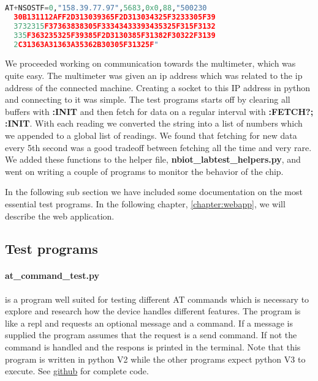 \documentclass[USenglish]{ifimaster}  %
\begin{document}
\begin{lstlisting}[caption={\acrshort{nb-iot} sample transmit},label={samplecommand},language=Python]
  AT+NSOSTF=0,"158.39.77.97",5683,0x0,88,"500230
  30B131112AFF2D313039365F2D313034325F3233305F39
  3732315F37363838305F33343433393435325F315F3132
  335F363235325F39385F2D3130385F31382F30322F3139
  2C31363A31363A35362B30305F31325F"
\end{lstlisting}

We proceeded working on communication towards the multimeter, which was quite easy. The multimeter was given an \acrshort{ip} address which was related to the \acrshort{ip} address of the connected machine. Creating a socket to this IP address in python and connecting to it was simple. The test programs starts off by clearing all buffers with \textbf{:INIT} and then fetch for data on a regular interval with \textbf{:FETCH?; :INIT}. With each reading we converted the string into a list of numbers which we appended to a global list of readings. We found that fetching for new data every 5th second was a good tradeoff between fetching all the time and very rare. We added these functions to the helper file, \textbf{nbiot\_labtest\_helpers.py}, and went on writing a couple of programs to monitor the behavior of the chip.

In the following sub section we have included some documentation on the most essential test programs. In the following chapter, \vref{chapter:webapp}, we will describe the web application.

\subsection{Test programs}
\paragraph{\textbf{at\_command\_test.py}} is a program well suited for testing different AT commands which is necessary to explore and research how the device handles different features. The program is like a \acrshort{repl} and requests an optional message and a command. If a message is supplied the program assumes that the request is a send command. If not the command is handled and the respons is printed in the terminal. Note that this program is written in python V2 while the other programs expect python V3 to execute. See \href{https://github.com/henninghaakonsen/thesis/blob/master/code/at_command_test.py}{github}\cite{code:atcommand} for complete code.
\end{document}
